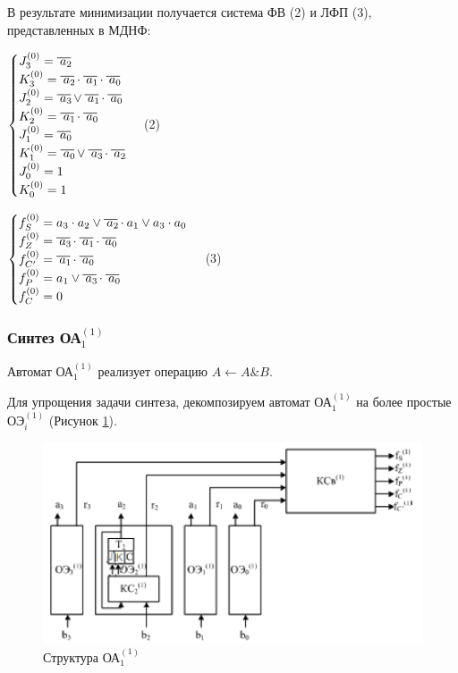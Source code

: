 

В результате минимизации получается система ФВ (2) и ЛФП (3), представленных в МДНФ:

$
\begin{cases}
J^{(0)}_{3} = \oline{a_2}
\\
K^{(0)}_{3} = \oline{a_2} \cdot \oline{a_1} \cdot \oline{a_0}
\\
J^{(0)}_{2} = \oline{a_3} \vee \oline{a_1} \cdot \oline{a_0}
\\
K^{(0)}_{2} = \oline{a_1} \cdot \oline{a_0}
\\
J^{(0)}_{1} = \oline{a_0}
\\
K^{(0)}_{1} = \oline{a_0} \vee \oline{a_3} \cdot \oline{a_2}
\\
J^{(0)}_{0} = 1
\\
K^{(0)}_{0} = 1
\end{cases}
$ (2)

$
\begin{cases}
f^{(0)}_{S} = a_3 \cdot a_2 \vee \oline{a_2} \cdot a_1 \vee a_3 \cdot a_0
\\
f^{(0)}_{Z} = \oline{a_3} \cdot \oline{a_1} \cdot \oline{a_0}
\\
f^{(0)}_{C'} = \oline{a_1} \cdot \oline{a_0}
\\
f^{(0)}_{P} = a_1 \vee \oline{a_3} \cdot \oline{a_0}
\\
f^{(0)}_{C} = 0
\end{cases}
$ (3)


\subsubsection{Синтез ОА$^{(1)}_{1}$}

Автомат ОА$^{(1)}_{1}$ реализует операцию $A \leftarrow A \& B$.

Для упрощения задачи синтеза, декомпозируем автомат ОА$^{(1)}_{1}$ на более простые ОЭ$^{(1)}_i$ (Рисунок \ref{figure:oa11_str}). 

\begin{figure}[H]
	\includegraphics[scale=0.6]{images/oe.png}
	\caption{Структура ОА$^{(1)}_{1}$}
	\label{figure:oa11_str}
\end{figure}

